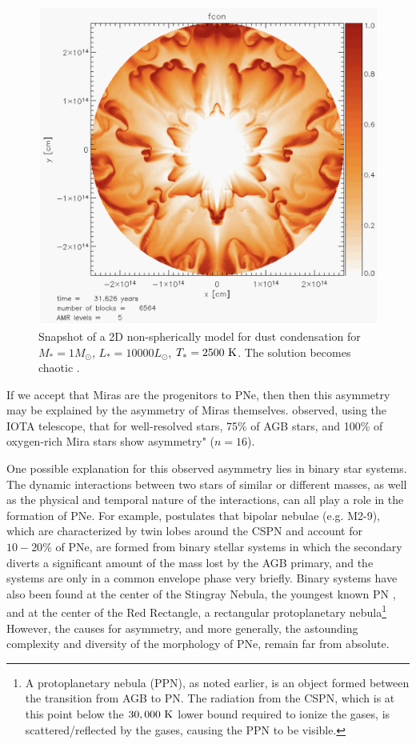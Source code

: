 \documentclass[twocolumn]{aastex63}
\begin{document}
\begin{figure}[ht]
    \includegraphics[width=\textwidth]{dust_condensation.png}
    \caption{Snapshot of a 2D non-spherically model for dust condensation for $M_* = 1M_\odot$, $L_* = 10000L_\odot$, $T_* = 2500~{\rm K}$. The solution becomes chaotic \citep{woitke}.}
    \label{fig:dust_condensation}
\end{figure}

If we accept that Miras are the progenitors to PNe, then then this asymmetry may be explained by the asymmetry of Miras themselves. \cite{ragland} observed, using the IOTA telescope, that for well-resolved stars, 75\% of AGB stars, and 100\% of oxygen-rich Mira stars show asymmetry" ($n=16$).

One possible explanation for this observed asymmetry lies in binary star systems. The dynamic interactions between two stars of similar or different masses, as well as the physical and temporal nature of the interactions, can all play a role in the formation of PNe. For example, \cite{soker1998} postulates that bipolar nebulae (e.g. M2-9), which are characterized by twin lobes around the CSPN and account for $10-20\%$ of PNe, are formed from binary stellar systems in which the secondary diverts a significant amount of the mass lost by the AGB primary, and the systems are only in a common envelope phase very briefly. Binary systems have also been found at the center of the Stingray Nebula, the youngest known PN \citep{bobrowsky}, and at the center of the Red Rectangle, a rectangular protoplanetary nebula\footnote{A protoplanetary nebula (PPN), as noted earlier, is an object formed between the transition from AGB to PN. The radiation from the CSPN, which is at this point below the $30,000~{\rm K}$ lower bound required to ionize the gases, is scattered/reflected by the gases, causing the PPN to be visible.} \citep{cohen} However, the causes for asymmetry, and more generally, the astounding complexity and diversity of the morphology of PNe, remain far from absolute. 
\end{document}
